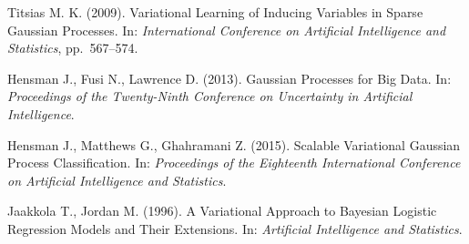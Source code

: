 \documentclass[12pt]{article}
\begin{document}
\pagebreak
\begin{thebibliography}{99}

	Titsias M. K. (2009).  Variational Learning of Inducing Variables in Sparse Gaussian
	Processes.  In: {\it International Conference on Artificial Intelligence and Statistics}, pp.~567–574.

	Hensman J., Fusi N., Lawrence D. (2013).  Gaussian Processes for Big Data.  In: {\it Proceedings of the Twenty-Ninth Conference on Uncertainty in Artificial Intelligence}.

	Hensman J., Matthews G., Ghahramani Z. (2015). Scalable Variational Gaussian Process Classification.  In: {\it Proceedings of the Eighteenth International Conference on Artificial Intelligence and Statistics}.

	Jaakkola T., Jordan M. (1996). A Variational Approach to Bayesian Logistic Regression Models and Their Extensions. In: {\it Artificial Intelligence and Statistics}.

\end{thebibliography}	
\end{document}
